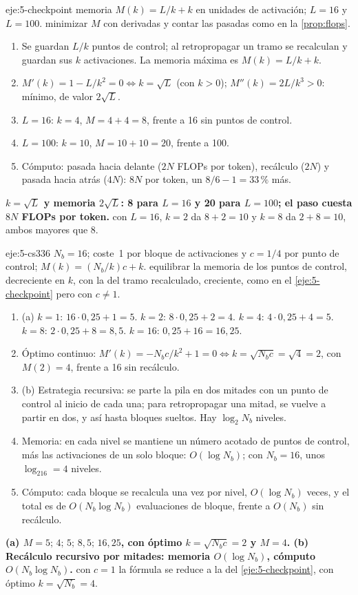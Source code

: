 \begin{solucion}{eje:5-checkpoint}
\datos memoria $M(k)=L/k+k$ en unidades de activación; $L=16$ y $L=100$.
\planteamiento minimizar $M$ con derivadas y contar las pasadas como en la \cref{prop:flops}.
\pasos
\begin{enumerate}[label=\arabic*.]
  \item Se guardan $L/k$ puntos de control; al retropropagar un tramo se recalculan y guardan sus $k$ activaciones. La memoria máxima es $M(k)=L/k+k$.
  \item $M'(k)=1-L/k^{2}=0\iff k=\sqrt L$ (con $k>0$); $M''(k)=2L/k^{3}>0$: mínimo, de valor $2\sqrt L$.
  \item $L=16$: $k=4$, $M=4+4=8$, frente a 16 sin puntos de control.
  \item $L=100$: $k=10$, $M=10+10=20$, frente a 100.
  \item Cómputo: pasada hacia delante ($2N$ FLOPs por token), recálculo ($2N$) y pasada hacia atrás ($4N$): $8N$ por token, un $8/6-1=33\,\%$ más.
\end{enumerate}
\resultado \textbf{$k=\sqrt L$ y memoria $2\sqrt L$: 8 para $L=16$ y 20 para $L=100$; el paso cuesta $8N$ FLOPs por token.}
\comprobacion con $L=16$, $k=2$ da $8+2=10$ y $k=8$ da $2+8=10$, ambos mayores que 8.
\end{solucion}

\begin{solucion}{eje:5-cs336}
\datos $N_b=16$; coste~1 por bloque de activaciones y $c=1/4$ por punto de control; $M(k)=(N_b/k)c+k$.
\planteamiento equilibrar la memoria de los puntos de control, decreciente en $k$, con la del tramo recalculado, creciente, como en el \cref{eje:5-checkpoint} pero con $c\ne 1$.
\pasos
\begin{enumerate}[label=\arabic*.]
  \item (a) $k=1$: $16\cdot 0{,}25+1=5$. $k=2$: $8\cdot 0{,}25+2=4$. $k=4$: $4\cdot 0{,}25+4=5$. $k=8$: $2\cdot 0{,}25+8=8{,}5$. $k=16$: $0{,}25+16=16{,}25$.
  \item Óptimo continuo: $M'(k)=-N_bc/k^{2}+1=0\iff k=\sqrt{N_bc}=\sqrt 4=2$, con $M(2)=4$, frente a 16 sin recálculo.
  \item (b) Estrategia recursiva: se parte la pila en dos mitades con un punto de control al inicio de cada una; para retropropagar una mitad, se vuelve a partir en dos, y así hasta bloques sueltos. Hay $\log_2N_b$ niveles.
  \item Memoria: en cada nivel se mantiene un número acotado de puntos de control, más las activaciones de un solo bloque: $O(\log N_b)$; con $N_b=16$, unos $\log_216=4$ niveles.
  \item Cómputo: cada bloque se recalcula una vez por nivel, $O(\log N_b)$ veces, y el total es de $O(N_b\log N_b)$ evaluaciones de bloque, frente a $O(N_b)$ sin recálculo.
\end{enumerate}
\resultado \textbf{(a) $M=5;\,4;\,5;\,8{,}5;\,16{,}25$, con óptimo $k=\sqrt{N_bc}=2$ y $M=4$. (b) Recálculo recursivo por mitades: memoria $O(\log N_b)$, cómputo $O(N_b\log N_b)$.}
\comprobacion con $c=1$ la fórmula se reduce a la del \cref{eje:5-checkpoint}, con óptimo $k=\sqrt{N_b}=4$.
\end{solucion}

